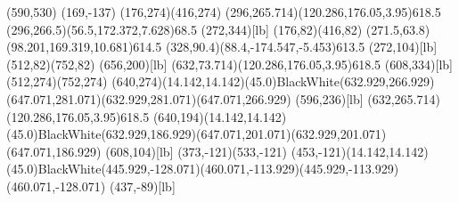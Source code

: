 






% 



\begin{axopicture}(590,530) (169,-137)
  \Line[arrow,arrowpos=0.5,arrowlength=12.5,arrowwidth=5,arrowinset=0.2](176,274)(416,274)
  \PhotonArc[clock](296,265.714)(120.286,176.05,3.95){6}{18.5}
  \PhotonArc[clock](296,266.5)(56.5,172.372,7.628){6}{8.5}
  \Text(272,344)[lb]{\Huge{}}
  \Line[arrow,arrowpos=0.5,arrowlength=12.5,arrowwidth=5,arrowinset=0.2](176,82)(416,82)
  \PhotonArc[clock](271.5,63.8)(98.201,169.319,10.681){6}{14.5}
  \PhotonArc(328,90.4)(88.4,-174.547,-5.453){6}{13.5}
  \Text(272,104)[lb]{\Huge{}}
  \Line[arrow,arrowpos=0.5,arrowlength=12.5,arrowwidth=5,arrowinset=0.2](512,82)(752,82)
  \Text(656,200)[lb]{\Huge{}}
  \PhotonArc[clock](632,73.714)(120.286,176.05,3.95){6}{18.5}
  \Text(608,334)[lb]{\Huge{}}
  \Line[arrow,arrowpos=0.5,arrowlength=12.5,arrowwidth=5,arrowinset=0.2](512,274)(752,274)
  \COval(640,274)(14.142,14.142)(45.0){Black}{White}\Line(632.929,266.929)(647.071,281.071)\Line(632.929,281.071)(647.071,266.929)
  \Text(596,236)[lb]{\Huge{}}
  \PhotonArc[clock](632,265.714)(120.286,176.05,3.95){6}{18.5}
  \COval(640,194)(14.142,14.142)(45.0){Black}{White}\Line(632.929,186.929)(647.071,201.071)\Line(632.929,201.071)(647.071,186.929)
  \Text(608,104)[lb]{\Huge{}}
  \Line[arrow,arrowpos=0.5,arrowlength=12.5,arrowwidth=5,arrowinset=0.2](373,-121)(533,-121)
  \COval(453,-121)(14.142,14.142)(45.0){Black}{White}\Line(445.929,-128.071)(460.071,-113.929)\Line(445.929,-113.929)(460.071,-128.071)
  \Text(437,-89)[lb]{\Huge{}}
\end{axopicture}

% 

